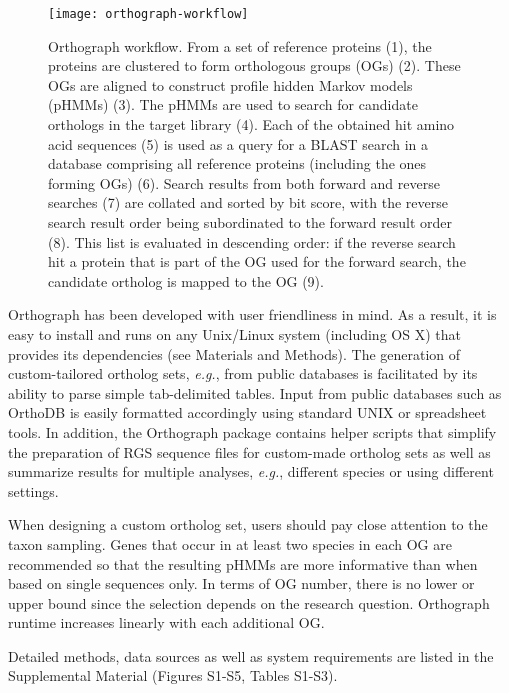 \begin{figure}[t]
\begin{center}
\texttt{[image: orthograph-workflow]}
\caption[Orthograph workflow]{Orthograph workflow. From a set of
reference proteins (1), the proteins are clustered to form orthologous groups
(OGs) (2). These OGs are aligned to construct profile hidden Markov models
(pHMMs) (3). The pHMMs are used to search for candidate orthologs in the
target library (4). Each of the obtained hit amino acid sequences (5) is used
as a query for a BLAST search in a database comprising all reference proteins
(including the ones forming OGs) (6). Search results from both forward and
reverse searches (7) are collated and sorted by bit score, with the reverse
search result order being subordinated to the forward result order (8). This
list is evaluated in descending order: if the reverse search hit a protein
that is part of the OG used for the forward search, the candidate ortholog is
mapped to the OG (9).}
\label{fig:orthograph-workflow}
\end{center}
\end{figure}

Orthograph has been developed with user friendliness in mind. As a
result, it is easy to install and runs on any Unix/Linux system
(including OS X) that provides its dependencies (see Materials and
Methods). The generation of custom-tailored ortholog sets, \emph{e.g.},
from public databases is facilitated by its ability to parse simple
tab-delimited tables. Input from public databases such as OrthoDB is
easily formatted accordingly using standard UNIX or spreadsheet tools.
In addition, the Orthograph package contains helper scripts that
simplify the preparation of RGS sequence files for custom-made ortholog
sets as well as summarize results for multiple analyses, \emph{e.g.},
different species or using different settings.

When designing a custom ortholog set, users should pay close attention
to the taxon sampling. Genes that occur in at least two species in each
OG are recommended so that the resulting pHMMs are more informative than
when based on single sequences only. In terms of OG number, there is no
lower or upper bound since the selection depends on the research
question. Orthograph runtime increases linearly with each additional OG.

Detailed methods, data sources as well as system requirements are listed
in the Supplemental Material (Figures S1-S5, Tables S1-S3).

